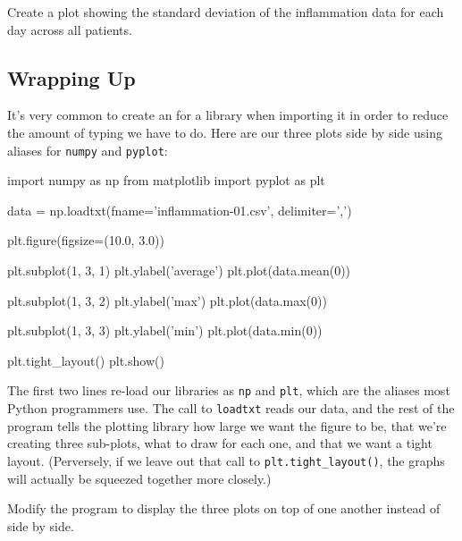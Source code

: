 \documentclass{book}
\begin{document}
\begin{challenge}
  Create a plot showing the standard deviation of the inflammation data
  for each day across all patients.
\end{challenge}

\subsection{Wrapping Up}

It's very common to create an  for a
library when importing it in order to reduce the amount of typing we
have to do. Here are our three plots side by side using aliases for
\texttt{numpy} and \texttt{pyplot}:

\begin{VerbIn}
import numpy as np
from matplotlib import pyplot as plt

data = np.loadtxt(fname='inflammation-01.csv', delimiter=',')

plt.figure(figsize=(10.0, 3.0))

plt.subplot(1, 3, 1)
plt.ylabel('average')
plt.plot(data.mean(0))

plt.subplot(1, 3, 2)
plt.ylabel('max')
plt.plot(data.max(0))

plt.subplot(1, 3, 3)
plt.ylabel('min')
plt.plot(data.min(0))

plt.tight_layout()
plt.show()
\end{VerbIn}


The first two lines re-load our libraries as \texttt{np} and
\texttt{plt}, which are the aliases most Python programmers use. The
call to \texttt{loadtxt} reads our data, and the rest of the program
tells the plotting library how large we want the figure to be, that
we're creating three sub-plots, what to draw for each one, and that we
want a tight layout. (Perversely, if we leave out that call to
\texttt{plt.tight\_layout()}, the graphs will actually be squeezed
together more closely.)

\begin{challenge}
  Modify the program to display the three plots on top of one another
  instead of side by side.
\end{challenge}
\end{document}
